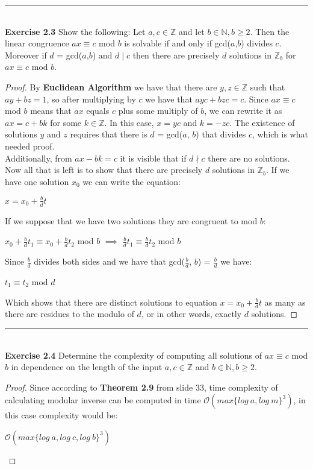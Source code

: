 \documentclass[a4paper]{article}
\begin{document}
\noindent\rule{12cm}{0.4pt}\\
\noindent \textbf{Exercise 2.3} Show the following:
Let $a, c \in \mathbb{Z}$ and let $b \in \mathbb{N}, b \geq 2$. Then the linear congruence $ax \equiv c$ mod $b$ is solvable if and only if gcd($a$,$b$) divides $c$. Moreover if $d$ = gcd($a$,$b$) and $d \mid c$ then there are precisely $d$ solutions in $\mathbb{Z}_{b}$ for $ax \equiv c$ mod $b$.
\begin{proof}
By \textbf{Euclidean Algorithm} we have that there are $y, z \in \mathbb{Z}$ such that $ay + bz = 1$, so after multiplying by $c$ we have that $ayc + bzc = c$. Since $ax \equiv c$ mod $b$ means that $ax$ equals $c$ plus some multiply of $b$, we can rewrite it as $ax = c + bk$ for some $k \in  \mathbb{Z}$. In this case, $x = yc$ and $k = -zc$. The existence of solutions $y$ and $z$ requires that there is $d$ = gcd($a$, $b$) that divides $c$, which is what needed proof. \\
Additionally, from $ax - bk = c$ it is visible that if $d \nmid c$ there are no solutions. Now all that is left is to show that there are precisely $d$ solutions in $\mathbb{Z}_b$. If we have one solution $x_0$ we can write the equation:
\begin{center}
$x = x_0 + \frac{b}{d}t$
\end{center}
If we suppose that we have two solutions they are congruent to mod $b$:
\begin{center}
$x_0 + \frac{b}{d}t_1 \equiv x_0 + \frac{b}{d}t_2$ mod $b$ $\implies$ $\frac{b}{d}t_1 \equiv \frac{b}{d}t_2$ mod $b$
\end{center}
Since $\frac{b}{d}$ divides both sides and we have that gcd($\frac{b}{d}$, $b$) = $\frac{b}{d}$ we have:
\begin{center}
	$t_1 \equiv t_2$ mod $d$
\end{center}
Which shows that there are distinct solutions to equation $x = x_0 + \frac{b}{d}t$ as many as there are residues to the modulo of $d$, or in other words, exactly $d$ solutions.
\end{proof}



\noindent\rule{12cm}{0.4pt}\\
\noindent \textbf{Exercise 2.4} Determine the complexity of computing all solutions of $ax \equiv c$ mod $b$ in dependence on the length of the input $a, c \in \mathbb{Z}$ and $b \in \mathbb{N}, b \geq 2$.
\begin{proof}
Since according to \textbf{Theorem 2.9} from slide 33, time complexity of calculating modular inverse can be computed in time $\mathcal{O}(max\{log\ a, log\ m\}^3)$, in this case complexity would be:
\begin{center}
$\mathcal{O}(max\{log\ a, log\ c, log\ b\}^3)$
\end{center}
\end{proof}
\end{document}
